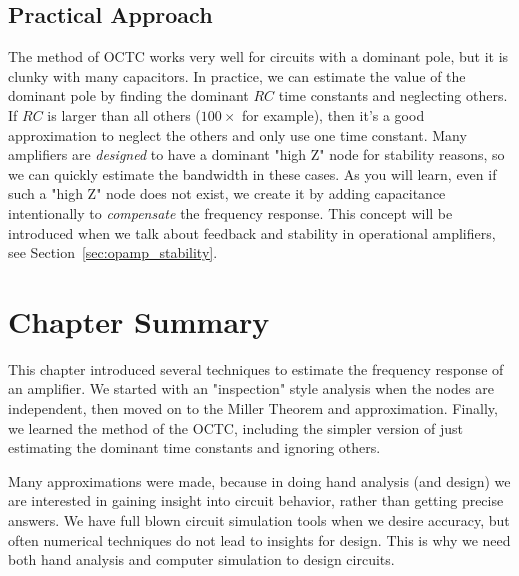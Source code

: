 \subsection{Practical Approach}
The method of OCTC works very well for circuits with a dominant pole, but it is clunky with many capacitors.  In practice, we can estimate the value of the dominant pole by finding the dominant $RC$ time constants and neglecting others.  If $RC$ is larger than all others ($100\times$ for example), then it's a good approximation to neglect the others and only use one time constant. Many amplifiers are \textit{designed} to have a dominant "high Z" node for stability reasons, so we can quickly estimate the bandwidth in these cases.  As you will learn, even if such a "high Z" node does not exist, we create it by adding capacitance intentionally to \textit{compensate} the frequency response.  This concept will be introduced when we talk about feedback and stability in operational amplifiers, see Section~\ref{sec:opamp_stability}.
\newpage
\section{Chapter Summary}
This chapter introduced several techniques to estimate the frequency response of an amplifier. We started with an "inspection" style analysis when the nodes are independent, then moved on to the Miller Theorem and approximation.  Finally, we learned the method of the OCTC, including the simpler version of just estimating the dominant time constants and ignoring others.

Many approximations were made, because in doing hand analysis (and design) we are interested in gaining insight into circuit behavior, rather than getting precise answers.  We have full blown circuit simulation tools when we desire accuracy, but often numerical techniques do not lead to insights for design.  This is why we need both hand analysis and computer simulation to design circuits.
